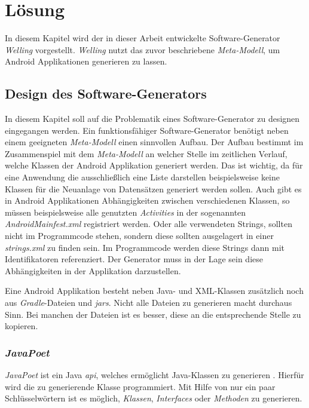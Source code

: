 \chapter{Lösung}
In diesem Kapitel wird der in dieser Arbeit entwickelte Software-Generator \textit{Welling} vorgestellt. \textit{Welling} nutzt das zuvor beschriebene \textit{Meta-Modell}, um Android Applikationen generieren zu lassen. 

\section{Design des Software-Generators}
In diesem Kapitel soll auf die Problematik eines Software-Generator zu designen eingegangen werden. Ein funktionsfähiger Software-Generator benötigt neben einem geeigneten \textit{Meta-Modell} einen sinnvollen Aufbau. Der Aufbau bestimmt im Zusammenspiel mit dem \textit{Meta-Modell} an welcher Stelle im zeitlichen Verlauf, welche Klassen der Android Applikation generiert werden. Das ist wichtig, da für eine Anwendung die ausschließlich eine Liste darstellen beispielsweise keine Klassen für die Neuanlage von Datensätzen generiert werden sollen. 
Auch gibt es in Android Applikationen Abhängigkeiten zwischen verschiedenen Klassen, so müssen beispielsweise alle genutzten \textit{Activities} in der sogenannten \textit{AndroidMainfest.xml} registriert werden. Oder alle verwendeten Strings, sollten nicht im Programmcode stehen, sondern diese sollten ausgelagert in einer \textit{strings.xml} zu finden sein. Im Programmcode werden diese Strings dann mit Identifikatoren referenziert. Der Generator muss in der Lage sein diese Abhängigkeiten in der Applikation darzustellen. 

Eine Android Applikation besteht neben Java- und XML-Klassen zusätzlich noch aus \textit{Gradle}-Dateien und \textit{\acfp{jar}}. Nicht alle Dateien zu generieren macht durchaus Sinn. Bei manchen der Dateien ist es besser, diese an die entsprechende Stelle zu kopieren.

\subsection{\textit{JavaPoet}}
\textit{JavaPoet} ist ein Java \textit{\ac{api}}, welches ermöglicht Java-Klassen zu generieren \cite{poet}. Hierfür wird die zu generierende Klasse programmiert. Mit Hilfe von nur ein paar Schlüsselwörtern ist es möglich, \textit{Klassen}, \textit{Interfaces} oder \textit{Methoden} zu generieren. 

